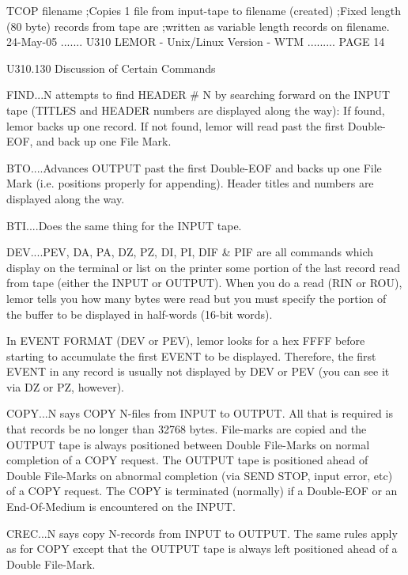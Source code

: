    TCOP filename ;Copies 1 file from input-tape to filename (created)
                 ;Fixed length (80 byte) records from tape are
                 ;written as variable length records on filename.
    
   24-May-05 ....... U310  LEMOR - Unix/Linux Version - WTM ......... PAGE  14
 
 
   U310.130  Discussion of Certain Commands
 
   FIND...N attempts to find HEADER # N by  searching  forward  on  the  INPUT
          tape  (TITLES  and  HEADER  numbers are displayed along the way): If
          found, lemor backs up one record. If   not  found,  lemor  will read
          past the first Double-EOF, and back up one File Mark.
 
   BTO....Advances  OUTPUT  past  the  first  Double-EOF and backs up one File
          Mark (i.e. positions properly  for  appending).  Header  titles  and
          numbers are displayed along the way.
 
   BTI....Does the same thing for the INPUT tape.
 
   DEV....PEV,  DA,  PA,  DZ,  PZ,  DI,  PI,  DIF & PIF are all commands which
          display on the terminal or list on the printer some portion  of  the
          last  record  read  from tape (either the INPUT or OUTPUT). When you
          do a read (RIN or ROU), lemor tells you how  many  bytes  were  read
          but  you  must  specify the portion of the buffer to be displayed in
          half-words (16-bit words).
 
          In EVENT FORMAT (DEV or PEV), lemor looks  for  a  hex  FFFF  before
          starting  to  accumulate the first EVENT to be displayed. Therefore,
          the first EVENT in any record is usually not  displayed  by  DEV  or
          PEV (you can see it via DZ or PZ, however).
 
   COPY...N  says  COPY  N-files from INPUT to OUTPUT. All that is required is
          that records be no longer than 32768 bytes.  File-marks  are  copied
          and  the  OUTPUT tape is always positioned between Double File-Marks
          on  normal  completion  of  a  COPY  request.  The  OUTPUT  tape  is
          positioned  ahead  of  Double File-Marks on abnormal completion (via
          SEND STOP, input  error,  etc)  of  a  COPY  request.  The  COPY  is
          terminated  (normally)  if  a  Double-EOF  or  an  End-Of-Medium  is
          encountered on the INPUT.
 
   CREC...N says copy N-records from INPUT to OUTPUT. The same rules apply  as
          for  COPY  except  that  the  OUTPUT  tape is always left positioned
          ahead of a Double File-Mark.
 
